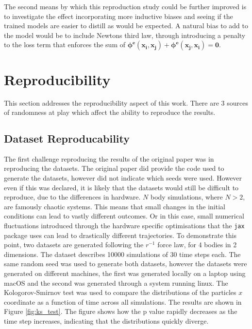 \documentclass[11pt]{article}
\begin{document}
    The second means by which this reproduction study could be further improved is to investigate the effect incorporating more inductive biases and seeing if the trained models are easier to distill as would be expected. A natural bias to add to the model would be to include Newtons third law, through introducing a penalty to the loss term that enforces the sum of $\mathbf{\phi^{e}(x_i, x_j)} + \mathbf{\phi^e(x_j,x_i)} = \textbf{0}$.

\section{ Reproducibility}
This section addresses the reproducibility aspect of this work. There are 3 sources of randomness at play which affect the ability to reproduce the results. 
\subsection{Dataset Reproducability}
The first challenge reproducing the results of the original paper was in reproducing the datasets. The original paper did provide the code used to generate the datasets, however did not indicate which seeds were used. However even if this was declared, it is likely that the datasets would still be difficult to reproduce, due to the differences in hardware. $N$ body simulations, where $N > 2$, are famously chaotic systems. This means that small changes in the initial conditions can lead to vastly different outcomes. Or in this case, small numerical fluctuations introduced through the hardware specific optimisations that the \texttt{jax} package uses can lead to drastically different trajectories. To demonstrate this point, two datasets are generated following the $r^{-1}$ force law, for 4 bodies in 2 dimensions. The dataset describes 10000 simulations of 30 time steps each. The same random seed was used to generate both datasets, however the datasets were generated on different machines, the first was generated locally on a laptop using macOS and the second was generated through a system running linux. The Kologorov-Smirnov test was used to compare the distributions of the particles $x$ coordinate as a function of time across all simulations. The results are shown in Figure \ref{fig:ks_test}. The figure shows how the p value rapidly decreases as the time step increases, indicating that the distributions quickly diverge. 
\end{document}
